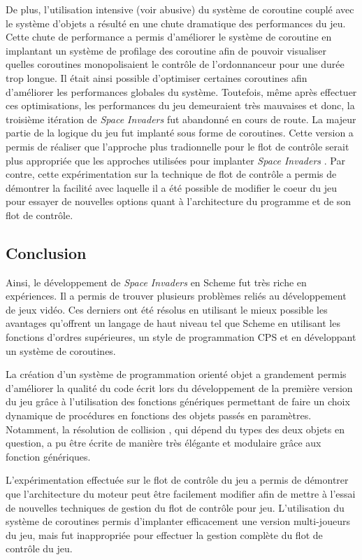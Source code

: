 \documentclass[12pt,oneside,letterpaper,francais]{book}
\newcommand{\si}{{\textit{Space Invaders }}}
\begin{document}
De plus, l'utilisation intensive (voir abusive) du système de
coroutine couplé avec le système d'objets a résulté en une chute
dramatique des performances du jeu. Cette chute de performance a
permis d'améliorer le système de coroutine en implantant un système de
profilage des coroutine afin de pouvoir visualiser quelles coroutines
monopolisaient le contrôle de l'ordonnanceur pour une durée trop
longue. Il était ainsi possible d'optimiser certaines coroutines afin
d'améliorer les performances globales du système. Toutefois, même
après effectuer ces optimisations, les performances du jeu demeuraient
très mauvaises et donc, la troisième itération de \si fut abandonné en
cours de route. La majeur partie de la logique du jeu fut implanté
sous forme de coroutines. Cette version a permis de réaliser que
l'approche plus tradionnelle pour le flot de contrôle serait plus
appropriée que les approches utilisées pour implanter \si. Par contre,
cette expérimentation sur la technique de flot de contrôle a permis de
démontrer la facilité avec laquelle il a été possible de modifier le
coeur du jeu pour essayer de nouvelles options quant à l'architecture
du programme et de son flot de contrôle.

\subsection{Conclusion}

Ainsi, le développement de \si en Scheme fut très riche en
expériences. Il a permis de trouver plusieurs problèmes reliés au
développement de jeux vidéo. Ces derniers ont été résolus en utilisant
le mieux possible les avantages qu'offrent un langage de haut niveau
tel que Scheme en utilisant les fonctions d'ordres supérieures, un
style de programmation CPS et en développant un système de coroutines.

La création d'un système de programmation orienté objet a grandement
permis d'améliorer la qualité du code écrit lors du développement de
la première version du jeu grâce à l'utilisation des fonctions
génériques permettant de faire un choix dynamique de procédures en
fonctions des objets passés en paramètres. Notamment, la résolution de
collision , qui dépend du types des deux objets en question, a pu être
écrite de manière très élégante et modulaire grâce aux fonction
génériques.

L'expérimentation effectuée sur le flot de contrôle du jeu a permis de
démontrer que l'architecture du moteur peut être facilement modifier
afin de mettre à l'essai de nouvelles techniques de gestion du flot de
contrôle pour jeu. L'utilisation du système de coroutines permis
d'implanter efficacement une version multi-joueurs du jeu, mais fut
inappropriée pour effectuer la gestion complète du flot de contrôle du
jeu.
\end{document}
